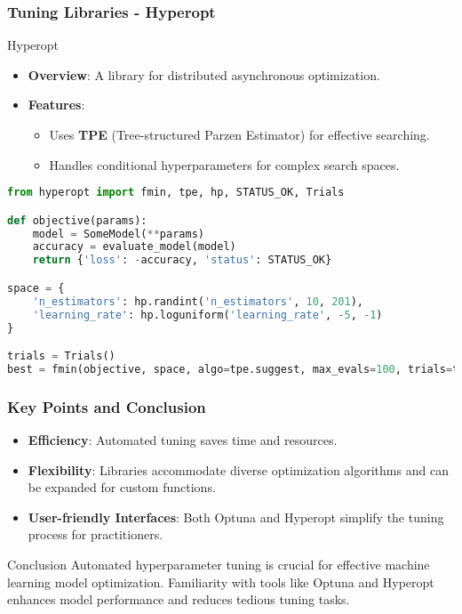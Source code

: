 \documentclass[aspectratio=169]{beamer}
\begin{document}
\begin{frame}[fragile]
    \frametitle{Tuning Libraries - Hyperopt}
    \begin{block}{Hyperopt}
        \begin{itemize}
            \item \textbf{Overview}: A library for distributed asynchronous optimization.
            \item \textbf{Features}:
            \begin{itemize}
                \item Uses \textbf{TPE} (Tree-structured Parzen Estimator) for effective searching.
                \item Handles conditional hyperparameters for complex search spaces.
            \end{itemize}
        \end{itemize}
    \end{block}
    \begin{lstlisting}[language=Python]
from hyperopt import fmin, tpe, hp, STATUS_OK, Trials

def objective(params):
    model = SomeModel(**params)
    accuracy = evaluate_model(model)
    return {'loss': -accuracy, 'status': STATUS_OK}

space = {
    'n_estimators': hp.randint('n_estimators', 10, 201),
    'learning_rate': hp.loguniform('learning_rate', -5, -1)
}

trials = Trials()
best = fmin(objective, space, algo=tpe.suggest, max_evals=100, trials=trials)
    \end{lstlisting}
\end{frame}

\begin{frame}[fragile]
    \frametitle{Key Points and Conclusion}
    \begin{itemize}
        \item \textbf{Efficiency}: Automated tuning saves time and resources.
        \item \textbf{Flexibility}: Libraries accommodate diverse optimization algorithms and can be expanded for custom functions.
        \item \textbf{User-friendly Interfaces}: Both Optuna and Hyperopt simplify the tuning process for practitioners.
    \end{itemize}
    
    \begin{block}{Conclusion}
        Automated hyperparameter tuning is crucial for effective machine learning model optimization. Familiarity with tools like Optuna and Hyperopt enhances model performance and reduces tedious tuning tasks.
    \end{block}
\end{frame}
\end{document}
